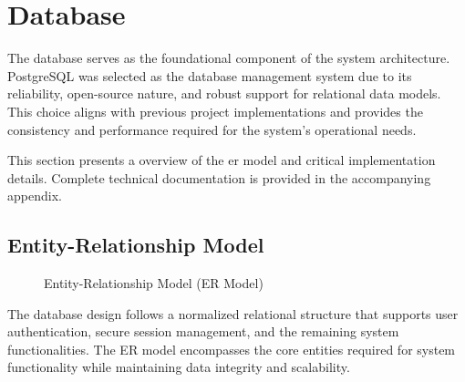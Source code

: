 \section{Database}
The database serves as the foundational component of the system architecture. PostgreSQL was selected as the database management system due to its reliability, open-source nature, and robust support for relational data models. This choice aligns with previous project implementations and provides the consistency and performance required for the system's operational needs.

This section presents a overview of the \ac{er model} and critical implementation details. Complete technical documentation is provided in the accompanying appendix.

\subsection{Entity-Relationship Model}

\begin{figure}[h]
    \begin{center}
    \end{center}
    \caption{Entity-Relationship Model (ER Model)}
    \label{fig:er_model}
\end{figure}

The database design follows a normalized relational structure that supports user authentication, secure session management, and the remaining system functionalities. The ER model encompasses the core entities required for system functionality while maintaining data integrity and scalability.


